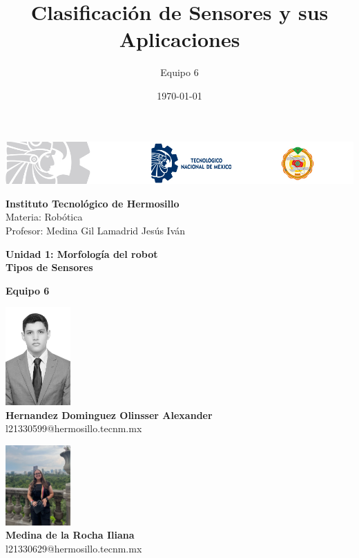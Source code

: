 \documentclass{article}
\title{Clasificación de Sensores y sus Aplicaciones}
\author{Equipo 6}
\date{\today}
\begin{document}
	
	\begin{titlepage}
		
		\begin{center}
			
			\includegraphics[width=\textwidth]{header-ith.png}
			
			\vspace{0.5cm}
			
			\textbf{Instituto Tecnológico de Hermosillo} \\
			Materia: Robótica \\
			Profesor: Medina Gil Lamadrid Jesús Iván \\
			
			\vspace{0.5cm}
			
			\textbf{Unidad 1: Morfología del robot} \\
			{\Huge \textbf{Tipos de Sensores}} \\
			
			\vspace{0.5cm}
			
			\textbf{Equipo 6} \\
			
			\begin{minipage}{0.45\textwidth}
				\begin{center}
					\includegraphics[width=2.5cm]{alexander.jpg} \\
					\textbf{Hernandez Dominguez Olinsser Alexander} \\
					l21330599@hermosillo.tecnm.mx\\
					
				\end{center}
			\end{minipage}
			\hfill
			\begin{minipage}{0.45\textwidth}
				\begin{center}
					\includegraphics[width=2.5cm]{iliana.jpg} \\
					\textbf{Medina de la Rocha Iliana} \\
					l21330629@hermosillo.tecnm.mx\\
					

\end{center}
\end{minipage}
\end{center}
\end{titlepage}
\end{document}
